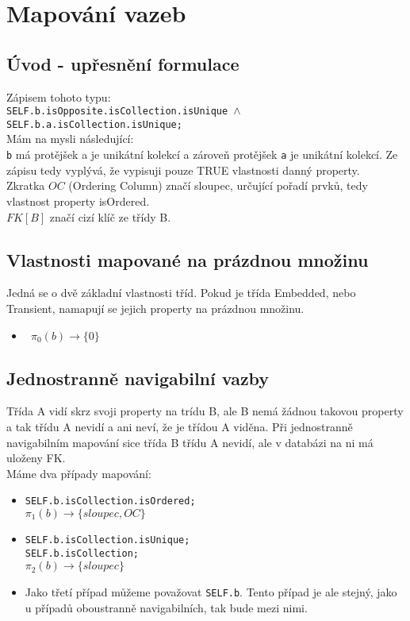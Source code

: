 \documentclass[11pt,a4paper]{article}
\begin{document}
\section{Mapování vazeb}
	\subsection{Úvod - upřesnění formulace}
	Zápisem tohoto typu:\\ 
	\texttt	{SELF.b.isOpposite.isCollection.isUnique $\wedge$ SELF.b.a.isCollection.isUnique; \\} 
	Mám na mysli následující:\\
	\texttt{b} má protějšek a je unikátní kolekcí a zároveň protějšek \texttt {a} je unikátní kolekcí.
	Ze zápisu tedy vyplývá, že vypisuji pouze TRUE vlastnosti danný property. \\
	Zkratka $OC$ (Ordering Column) značí sloupec, určující pořadí prvků, tedy vlastnost property isOrdered. \\
	$FK[B]$ značí cizí klíč ze třídy B. 		  							
	                                
	\subsection{Vlastnosti mapované na prázdnou množinu}
   		Jedná se o dvě základní vlastnosti tříd. Pokud je třída Embedded, nebo
   		Transient, namapují se jejich property na prázdnou množinu. 
   		\begin{itemize}				    
         	\item \texttt	{
         					$\pi_0(b) \to \{ 0\}$  
         					}
   		\end{itemize}
   	\subsection{Jednostranně navigabilní vazby}
   		Třída A vidí skrz svoji property na trídu B, ale B nemá žádnou takovou property a 
   		tak třídu A nevidí a ani neví, že je třídou A viděna. Při jednostranně navigabilním
   		mapování sice třída B třídu A nevidí, ale v databázi na ni má uloženy FK.
   		\\
   		Máme dva případy mapování:
   		\begin{itemize}				    
         	\item \texttt	{SELF.b.isCollection.isOrdered; \\}
         					$\pi_1(b) \to \{ sloupec, OC\}$
         					
         	\item \texttt	{SELF.b.isCollection.isUnique; \\
         					 SELF.b.isCollection; \\
         					$\pi_2(b) \to \{ sloupec\}$
         					}
         	\item Jako třetí případ můžeme považovat \texttt   {SELF.b}. Tento případ je ale stejný, 
         	jako u případů oboustranně navigabilních, tak bude mezi nimi.
         		  							
   		\end{itemize}
\end{document}
